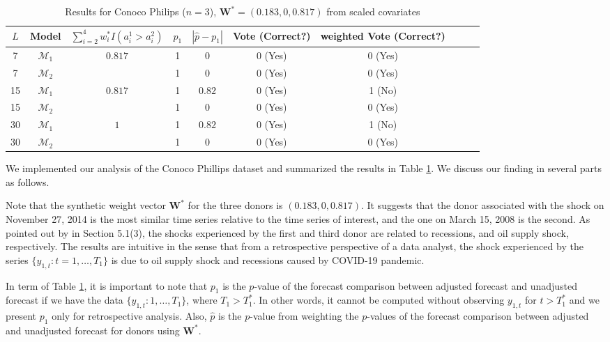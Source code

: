 \documentclass[11pt]{article}
\def\mbf#1{\mathbf{#1}} %
\def\mc#1{\mathcal{#1}} %
\def\mc#1{\mathcal{#1}}
\theoremstyle{definition}
\begin{document}
\begin{table}[H]
	\caption{Results for Conoco Philips ($n=3$), $\mbf{W}^* = (0.183, 0, 0.817)$ from scaled covariates} \label{coptable}
\begin{center}
  \begin{tabular}{cccccccccr}
     $L$  & Model & $\sum_{i=2}^4 w_i^* I(a_i^1 > a_i^2)$ & $p_1$ &  $|\hat{p}-p_1|$ & Vote (Correct?) & weighted Vote (Correct?)   \\
     \hline 
     7 & $\mc{M}_1$  & \multirow{2}{*}{$0.817$} & 1  & 0 & 0 (Yes) &0 (Yes)  \\      
     7 & $\mc{M}_2$  &  & 1 & $0$   & 0 (Yes) &0 (Yes)   \\[.2cm]
     15 & $\mc{M}_1$ & \multirow{2}{*}{$0.817$}  & 1   & $0.82$ & 0 (Yes) &1 (No)    \\
     15 &  $\mc{M}_2$ & & 1 & 0 &0 (Yes)  &0 (Yes)  \\[.2cm]
     30 &  $\mc{M}_1$ & \multirow{2}{*}{$1$}  & 1   & $0.82$ & 0 (Yes) &1 (No)   \\
     30 &  $\mc{M}_2$ &  & 1  & 0 &0 (Yes) & 0 (Yes)  
  \end{tabular}
\end{center}	
\end{table}


We implemented our analysis of the Conoco Phillips dataset and summarized the results in Table \ref{coptable}. We discuss our finding in several parts as follows.

Note that the synthetic weight vector $\mbf{W}^*$ for the three donors is $(0.183, 0, 0.817)$. It suggests that the donor associated with the shock on November 27, 2014 is the most similar time series relative to the time series of interest, and the one on March 15, 2008 is the second. As pointed out by \cite{lin2021minimizing} in Section 5.1(3), the shocks experienced by the first and  third donor are related to recessions, and oil supply shock, respectively. The results are intuitive in the sense that from a retrospective perspective of a data analyst, the shock experienced by the series $\{y_{1,t}\colon t = 1, \ldots, T_1\}$ is due to oil supply shock and recessions caused by COVID-19 pandemic.



In term of Table \ref{coptable}, it is important to note that $p_1$ is the $p$-value of the forecast comparison between adjusted forecast and unadjusted forecast if we have the data $\{y_{1,t} \colon 1, \ldots, T_1\}$, where $T_1 > T_1^*$. In other words, it cannot be computed without observing $y_{1, t}$ for $t > T_1^*$ and we present $p_1$ only for retrospective analysis. Also, $\hat{p}$ is the $p$-value from weighting the $p$-values of the forecast comparison  between adjusted and unadjusted forecast for donors using $\mbf{W}^*$. 
\end{document}
